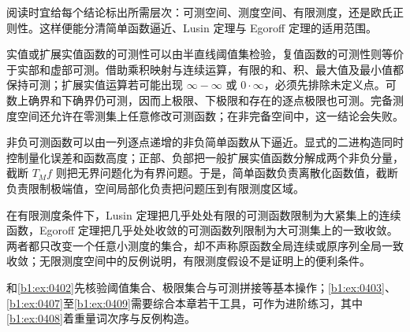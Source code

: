\ProseParagraphBreak

阅读时宜给每个结论标出所需层次：可测空间、测度空间、有限测度，还是欧氏正则性。这样便能分清简单函数逼近、Lusin 定理与 Egoroff 定理的适用范围。







\begin{chaptersummary}
实值或扩展实值函数的可测性可以由半直线阈值集检验，复值函数的可测性则等价于实部和虚部可测。借助乘积映射与连续运算，有限的和、积、最大值及最小值都保持可测；扩展实值运算若可能出现 \(\infty-\infty\) 或 \(0\cdot\infty\)，必须先排除未定义点。可数上确界和下确界仍可测，因而上极限、下极限和存在的逐点极限也可测。完备测度空间还允许在零测集上任意修改可测函数；在非完备空间中，这一结论会失败。

\ProseParagraphBreak

非负可测函数可以由一列逐点递增的非负简单函数从下逼近。显式的二进构造同时控制量化误差和函数高度；正部、负部把一般扩展实值函数分解成两个非负分量，截断 \(T_Mf\) 则把无界问题化为有界问题。于是，简单函数负责离散化函数值，截断负责限制极端值，空间局部化负责把问题压到有限测度区域。

\ProseParagraphBreak

在有限测度条件下，Lusin 定理把几乎处处有限的可测函数限制为大紧集上的连续函数，Egoroff 定理把几乎处处收敛的可测函数列限制为大可测集上的一致收敛。两者都只改变一个任意小测度的集合，却不声称原函数全局连续或原序列全局一致收敛；无限测度空间中的反例说明，有限测度假设不是证明上的便利条件。
\end{chaptersummary}

\BookExercises

和\cref{b1:ex:0402}先核验阈值集合、极限集合与可测拼接等基本操作；\cref{b1:ex:0403}、\cref{b1:ex:0407}至\cref{b1:ex:0409}需要综合本章若干工具，可作为进阶练习，其中\cref{b1:ex:0408}着重量词次序与反例构造。

